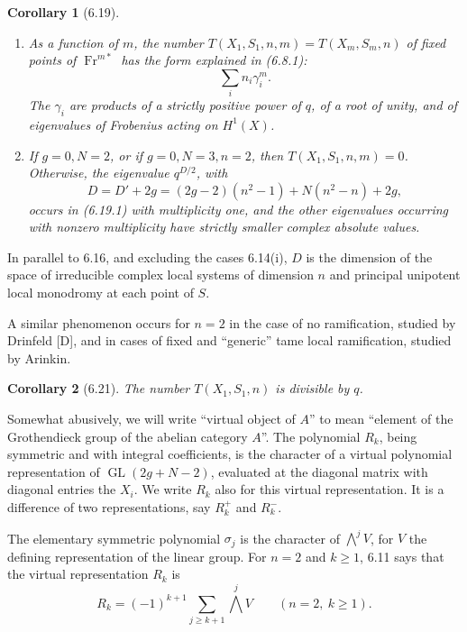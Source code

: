 \documentclass[10pt]{article}
\newcommand{\GL}{\operatorname{GL}}
\newcommand{\Fr}{\operatorname{Fr}}
\theoremstyle{deligne}
\newtheorem*{corollary*}{Corollary}
\newcommand{\heading}[1]{\vspace{0.7em}\noindent{\bfseries #1}\quad}
\begin{document}
\begin{corollary*}[6.19]
\begin{enumerate}[label=(\roman*)]
\item As a function of $m$, the number $T(X_1,S_1,n,m)=T(X_m,S_m,n)$ of fixed points of $\Fr^{m*}$ has the form explained in (6.8.1):
\begin{equation}\tag{6.19.1}
\sum_i n_i\gamma_i^m.
\end{equation}
The $\gamma_i$ are products of a strictly positive power of $q$, of a root of unity, and of eigenvalues of Frobenius acting on $H^1(X)$.
\item If $g=0,N=2$, or if $g=0,N=3,n=2$, then $T(X_1,S_1,n,m)=0$. Otherwise, the eigenvalue $q^{D/2}$, with
\[
D=D'+2g=(2g-2)(n^2-1)+N(n^2-n)+2g,
\]
occurs in (6.19.1) with multiplicity one, and the other eigenvalues occurring with nonzero multiplicity have strictly smaller complex absolute values.
\end{enumerate}
\end{corollary*}

\heading{6.20.} In parallel to 6.16, and excluding the cases 6.14(i), $D$ is the dimension of the space of irreducible complex local systems of dimension $n$ and principal unipotent local monodromy at each point of $S$.

A similar phenomenon occurs for $n=2$ in the case of no ramification, studied by Drinfeld [D], and in cases of fixed and ``generic'' tame local ramification, studied by Arinkin.

\begin{corollary*}[6.21]
The number $T(X_1,S_1,n)$ is divisible by $q$.
\end{corollary*}

\heading{6.22.} Somewhat abusively, we will write ``virtual object of $A$'' to mean ``element of the Grothendieck group of the abelian category $A$''. The polynomial $R_k$, being symmetric and with integral coefficients, is the character of a virtual polynomial representation of $\GL(2g+N-2)$, evaluated at the diagonal matrix with diagonal entries the $X_i$. We write $R_k$ also for this virtual representation. It is a difference of two representations, say $R_k^+$ and $R_k^-$.

\heading{Example 6.23.} The elementary symmetric polynomial $\sigma_j$ is the character of $\bigwedge^j V$, for $V$ the defining representation of the linear group. For $n=2$ and $k\ge1$, 6.11 says that the virtual representation $R_k$ is
\begin{equation}\tag{6.23.1}
R_k=(-1)^{k+1}\sum_{j\ge k+1}\bigwedge^jV\qquad(n=2,\ k\ge1).
\end{equation}
\end{document}
